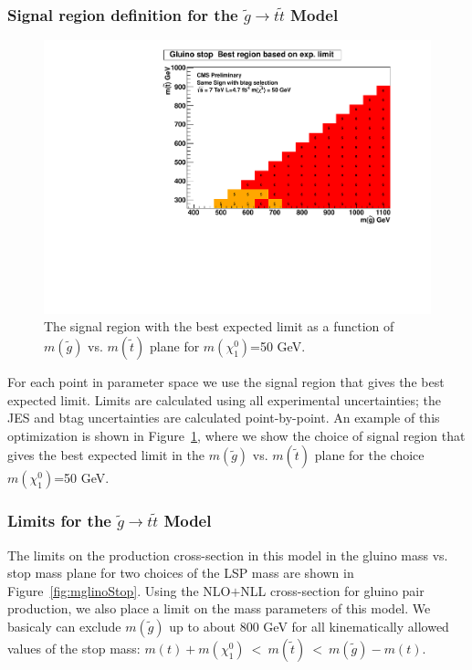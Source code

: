 \subsubsection{Signal region definition for the $\widetilde{g} \to t\widetilde{t}$ Model}
\label{sec:firststopdefinition}

\begin{figure}[htb]
\begin{center}
\includegraphics[width=0.50\linewidth]{figs/GlStop_50_BestSignalRegion.pdf}
\caption{The signal region with the best expected limit as a function of 
$m(\widetilde{g})$ vs. $m(\widetilde{t})$ plane for $m(\chi^0_1)$=50 GeV.
\label{fig:gluinostoptimize}}
\end{center}
\end{figure}


For each point in parameter space we use the signal region that gives
the best expected limit.  
Limits are calculated using all experimental
uncertainties; the JES and btag uncertainties are calculated point-by-point.
An example of this optimization is shown in Figure~\ref{fig:gluinostoptimize},
where we show the choice of signal region that gives the best expected limit
in the $m(\widetilde{g})$ vs. $m(\widetilde{t})$ plane for the choice
$m(\chi^0_1)$=50 GeV.




\subsubsection{Limits for the $\widetilde{g} \to t\widetilde{t}$ Model}
\label{sec:firststoplimits}

The limits on the production cross-section in this model in the 
gluino mass vs. stop mass plane for two choices of the 
LSP mass are shown in Figure~\ref{fig:mglinoStop}.
Using the 
NLO$+$NLL cross-section for gluino pair production, we also place a limit
on the mass parameters of this model.  We basicaly can exclude 
$m(\widetilde{g})$ up to about 800 GeV for all kinematically allowed
values of the stop mass: 
$m(t)+m(\chi^0_1)~<~m(\widetilde{t})~<~m(\widetilde{g})-m(t)$. 




